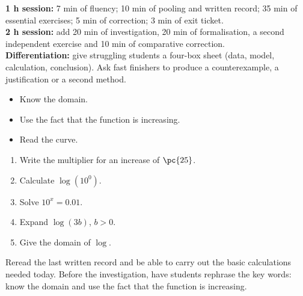 \ifmxteacher
\begin{method}
\textbf{1 h session:} 7 min of fluency; 10 min of pooling and written record; 35 min of essential exercises; 5 min of correction; 3 min of exit ticket.\\
\textbf{2 h session:} add 20 min of investigation, 20 min of formalisation, a second independent exercise and 10 min of comparative correction.\\
\textbf{Differentiation:} give struggling students a four-box sheet (data, model, calculation, conclusion). Ask fast finishers to produce a counterexample, a justification or a second method.
\end{method}
\fi
{}
\begin{objectives}\begin{itemize}\item Know the domain.\item Use the fact that the function is increasing.\item Read the curve.\end{itemize}\end{objectives}
\begin{fluency}\begin{enumerate}\item Write the multiplier for an increase of $\pc{25}$. \item Calculate $\log(10^0)$. \item Solve $10^x=\num{0,01}$. \item Expand $\log(3b)$, $b>0$. \item Give the domain of $\log$. \mxblank{$]0,+\infty[$}\end{enumerate}\end{fluency}
\begin{prerequisites}Reread the last written record and be able to carry out the basic calculations needed today. Before the investigation, have students rephrase the key words: know the domain and use the fact that the function is increasing.\end{prerequisites}

